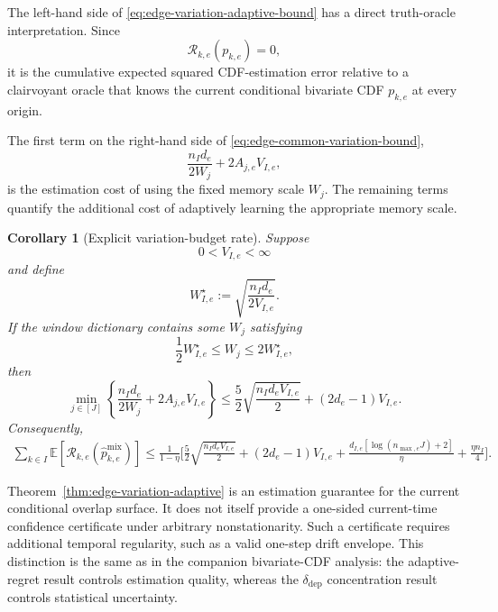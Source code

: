 \documentclass[11pt]{article}
\newtheorem{corollary}{Corollary}
\newcommand{\EE}{\mathbb{E}}
\begin{document}
The left-hand side of
\eqref{eq:edge-variation-adaptive-bound} has a direct truth-oracle
interpretation.  Since
\[
    \mathcal R_{k,e}(p_{k,e})=0,
\]
it is the cumulative expected squared CDF-estimation error relative to a
clairvoyant oracle that knows the current conditional bivariate CDF
$p_{k,e}$ at every origin.

The first term on the right-hand side of
\eqref{eq:edge-common-variation-bound},
\[
    \frac{n_Id_e}{2W_j}
    +
    2A_{j,e}V_{I,e},
\]
is the estimation cost of using the fixed memory scale $W_j$.  The remaining
terms quantify the additional cost of adaptively learning the appropriate
memory scale.

\begin{corollary}[Explicit variation-budget rate]
\label{cor:edge-variation-rate}
Suppose
\[
    0<V_{I,e}<\infty
\]
and define
\begin{equation}
    W^\star_{I,e}
    :=
    \sqrt{
        \frac{n_Id_e}{2V_{I,e}}
    }.
    \label{eq:edge-optimal-window}
\end{equation}
If the window dictionary contains some $W_j$ satisfying
\begin{equation}
    \frac12 W^\star_{I,e}
    \le
    W_j
    \le
    2W^\star_{I,e},
    \label{eq:edge-near-optimal-window}
\end{equation}
then
\begin{equation}
\boxed{
    \min_{j\in[J]}
    \left\{
        \frac{n_Id_e}{2W_j}
        +
        2A_{j,e}V_{I,e}
    \right\}
    \le
    \frac52
    \sqrt{
        \frac{n_Id_eV_{I,e}}{2}
    }
    +
    (2d_e-1)V_{I,e}.
}
\label{eq:edge-best-window-explicit}
\end{equation}
Consequently,
\begin{equation}
\boxed{
\begin{aligned}
    \sum_{k\in I}
    \EE\!\left[
        \mathcal R_{k,e}
        \left(
            \widehat p^{\mathrm{mix}}_{k,e}
        \right)
    \right]
    \le
    \frac1{1-\eta}
    \Bigg[
        \frac52
        \sqrt{
            \frac{n_Id_eV_{I,e}}{2}
        }
        +
        (2d_e-1)V_{I,e}
        +
        \frac{
            d_{I,e}
            [\log(n_{\max,e}J)+2]
        }{\eta}
        +
        \frac{\eta n_I}{4}
    \Bigg].
\end{aligned}
}
\label{eq:edge-variation-rate}
\end{equation}
\end{corollary}

Theorem~\ref{thm:edge-variation-adaptive} is an estimation guarantee for the
current conditional overlap surface.  It does not itself provide a one-sided
current-time confidence certificate under arbitrary nonstationarity.  Such a
certificate requires additional temporal regularity, such as a valid
one-step drift envelope.  This distinction is the same as in the companion
bivariate-CDF analysis: the adaptive-regret result controls estimation quality,
whereas the $\delta_{\mathrm{dep}}$ concentration result controls statistical
uncertainty.
\end{document}
